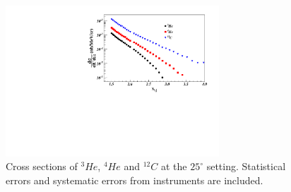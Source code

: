 		\begin{figure}[!ht]
		\begin{center}
		\includegraphics[width=8.0cm]{./figures/XS_Comp_25.pdf}
		\end{center}
		\vspace*{-5mm}
		\caption{Cross sections of $^{3}He$, $^{4}He$ and $^{12}C$ at the $25^{\circ}$ setting. Statistical errors and systematic errors from instruments are included.}
		\label{c12_he4}
		\end{figure}
